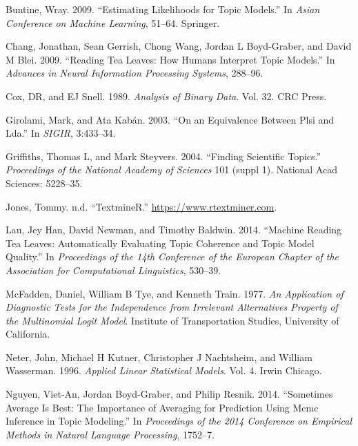\documentclass[conference,final,]{IEEEtran}
\begin{document}
\leavevmode\hypertarget{ref-buntine2009estimating}{}%
Buntine, Wray. 2009. ``Estimating Likelihoods for Topic Models.'' In
\emph{Asian Conference on Machine Learning}, 51--64. Springer.

\leavevmode\hypertarget{ref-chang2009reading}{}%
Chang, Jonathan, Sean Gerrish, Chong Wang, Jordan L Boyd-Graber, and
David M Blei. 2009. ``Reading Tea Leaves: How Humans Interpret Topic
Models.'' In \emph{Advances in Neural Information Processing Systems},
288--96.

\leavevmode\hypertarget{ref-cox1989analysis}{}%
Cox, DR, and EJ Snell. 1989. \emph{Analysis of Binary Data}. Vol. 32.
CRC Press.

\leavevmode\hypertarget{ref-girolami2003equivalence}{}%
Girolami, Mark, and Ata Kabán. 2003. ``On an Equivalence Between Plsi
and Lda.'' In \emph{SIGIR}, 3:433--34.

\leavevmode\hypertarget{ref-griffiths2004finding}{}%
Griffiths, Thomas L, and Mark Steyvers. 2004. ``Finding Scientific
Topics.'' \emph{Proceedings of the National Academy of Sciences} 101
(suppl 1). National Acad Sciences: 5228--35.

\leavevmode\hypertarget{ref-textminer}{}%
Jones, Tommy. n.d. ``TextmineR.'' \url{https://www.rtextminer.com}.

\leavevmode\hypertarget{ref-lau2014machine}{}%
Lau, Jey Han, David Newman, and Timothy Baldwin. 2014. ``Machine Reading
Tea Leaves: Automatically Evaluating Topic Coherence and Topic Model
Quality.'' In \emph{Proceedings of the 14th Conference of the European
Chapter of the Association for Computational Linguistics}, 530--39.

\leavevmode\hypertarget{ref-mcfadden1977application}{}%
McFadden, Daniel, William B Tye, and Kenneth Train. 1977. \emph{An
Application of Diagnostic Tests for the Independence from Irrelevant
Alternatives Property of the Multinomial Logit Model}. Institute of
Transportation Studies, University of California.

\leavevmode\hypertarget{ref-neter1996applied}{}%
Neter, John, Michael H Kutner, Christopher J Nachtsheim, and William
Wasserman. 1996. \emph{Applied Linear Statistical Models}. Vol. 4. Irwin
Chicago.

\leavevmode\hypertarget{ref-nguyen2014sometimes}{}%
Nguyen, Viet-An, Jordan Boyd-Graber, and Philip Resnik. 2014.
``Sometimes Average Is Best: The Importance of Averaging for Prediction
Using Mcmc Inference in Topic Modeling.'' In \emph{Proceedings of the
2014 Conference on Empirical Methods in Natural Language Processing},
1752--7.
\end{document}
